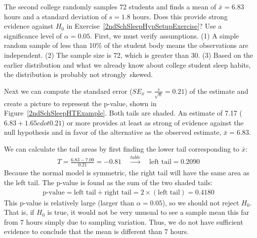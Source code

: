 \begin{example}{The second college randomly samples 72 students and finds a mean of $\bar{x} = 6.83$ hours and a standard deviation of $s=1.8$ hours. Does this provide strong evidence against $H_0$ in Exercise~\ref{2ndSchSleepHypSetupExercise}? Use a significance level of $\alpha=0.05$.}
First, we must verify assumptions. (1) A simple random sample of less than 10\% of the student body means the observations are independent. (2) The sample size is 72, which is greater than 30. (3) Based on the earlier distribution and what we already know about college student sleep habits, the distribution is probably not strongly~skewed.

Next we can compute the standard error ($SE_{\bar{x}} = \frac{s}{\sqrt{n}} = 0.21$) of the estimate and create a picture to represent the p-value, shown in Figure~\ref{2ndSchSleepHTExample}. Both tails are shaded. An estimate of 7.17 ($6.83 + 1.65 cdot 0.21$) or more provides at least as strong of evidence against the null hypothesis and in favor of the alternative as the observed estimate, $\bar{x} = 6.83$.

We can calculate the tail areas by first finding the lower tail corresponding to $\bar{x}$:
\begin{eqnarray*}
T = \frac{6.83 - 7.00}{0.21} = -0.81 \quad\stackrel{table}{\rightarrow}\quad \text{left tail}=0.2090
\end{eqnarray*}
Because the normal model is symmetric, the right tail will have the same area as the left tail. The p-value is found as the sum of the two shaded tails:
\begin{eqnarray*}
\text{p-value} = \text{left tail} + \text{right tail} = 2\times(\text{left tail}) = 0.4180
\end{eqnarray*}
This p-value is relatively large (larger than $\alpha=0.05$), so we should not reject $H_0$. That is, if $H_0$ is true, it would not be very unusual to see a sample mean this far from 7 hours simply due to sampling variation. Thus, we do not have sufficient evidence to conclude that the mean is different than 7 hours.


\end{example}

